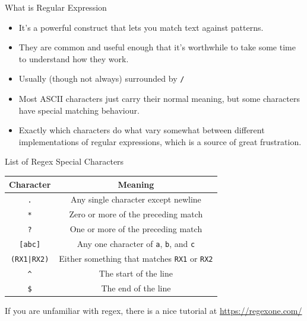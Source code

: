\documentclass[12pt]{beamer}
\begin{document}
\begin{frame}{What is Regular Expression}
  \begin{itemize}
    \item It's a powerful construct that lets you match text against patterns.
    \item They are common and useful enough that it’s worthwhile to take some time to understand how they work.
    \item Usually (though not always) surrounded by \texttt{/}
    \item Most ASCII characters just carry their normal meaning, but some characters have special matching behaviour.
    \item Exactly which characters do what vary somewhat between different implementations of regular expressions, which is a source of great frustration.
  \end{itemize}
\end{frame}

\begin{frame}{List of Regex Special Characters}
  \begin{tabular}{|c|c|}
    \hline
    \textbf{Character} & \textbf{Meaning}                                            \\ \hline
    \texttt{.}         & Any single character except newline                         \\ \hline
    \texttt{*}         & Zero or more of the preceding match                         \\ \hline
    \texttt{?}         & One or more of the preceding match                          \\ \hline
    \texttt{[abc]}     & Any one character of \texttt{a}, \texttt{b}, and \texttt{c} \\ \hline
    \texttt{(RX1|RX2)} & Either something that matches \texttt{RX1} or \texttt{RX2}  \\ \hline
    \texttt{\^{}}      & The start of the line                                       \\ \hline
    \texttt{\$}        & The end of the line                                         \\ \hline
  \end{tabular}

  If you are unfamiliar with regex, there is a nice tutorial at \url{https://regexone.com/}
\end{frame}
\end{document}
